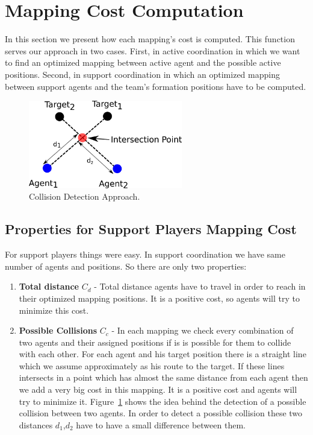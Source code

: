 \section{Mapping Cost Computation}
In this section we present how each mapping's cost is computed. This function serves our approach in two cases. First, in active coordination in which we want to find an optimized mapping between active agent and the possible active positions. Second, in support coordination in which an optimized mapping between support agents and the team's formation positions have to be computed.

\begin{figure}[t!]
\centering
  \includegraphics[width=0.6\textwidth]{Chapter4/figures/AvoidCollision.pdf}
  \caption{Collision Detection Approach.} 
  \label{fig:AvoidCollision}
\end{figure}

\subsection{Properties for Support Players Mapping Cost}
For support players things were easy. In support coordination we have same number of agents and positions. So there are only two properties:  
\begin{enumerate}
\item \textbf{Total distance }$C_{d}$ - Total distance agents have to travel in order to reach in their optimized mapping positions. It is a positive cost, so agents will try to minimize this cost.
\item \textbf{Possible Collisions }$C_{c}$ - In each mapping we check every combination of two agents and their assigned positions if is is possible for them to collide with each other. For each agent and his target position there is a straight line which we assume approximately as his route to the target. If these lines intersects in a point which has almost the same distance from each agent then we add a very big cost in this mapping. It is a positive cost and agents will try to minimize it. Figure~\ref{fig:AvoidCollision} shows the idea behind the detection of a possible collision between two agents. In order to detect a possible collision these two distances $d_{1}$,$d_{2}$ have to have a small difference between them. 
\end{enumerate}

